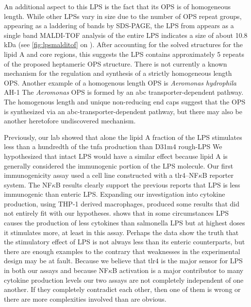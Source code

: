 An additional aspect to this \ac{LPS} is the fact that its \ac{OPS} is of homogeneous length. While
other \ac{LPS}s vary in size due to the number of \ac{OPS} repeat groups, appearing as a laddering
of bands by \ac{SDS-PAGE}, the \ac{LPS} from \caulobacter appears as a single
band \ac{MALDI-TOF} analysis of the entire \ac{LPS} indicates a size of
about 10.8 kDa (see \cref{fig:lpsmalditof} on ).  After accounting for the
solved structures for the lipid A and core regions, this suggests the \ac{LPS} contains
approximately 5 repeats of the proposed heptameric \ac{OPS} structure.  There is not currently a
known mechanism for the regulation and synthesis of a strictly homogeneous
length \ac{OPS}. Another example of a homogenous length \ac{OPS} is
\textit{Aeromonas hydrophila} AH-1 The
\textit{Aeromonas} \ac{OPS} is formed by an \ac{abc} transporter-dependent
pathway. The homogenous length and unique non-reducing end caps suggest that
the \caulobacter \ac{OPS} is synthesized via an \ac{abc}-transporter-dependent
pathway, but there may also be another heretofore undiscovered mechanism. 


Previously, our lab showed that alone the \caulobacter{} lipid A fraction of the \ac{LPS} stimulates less
than a hundredth of the \ac{tnfa} production than \ecoli{} D31m4
rough-\ac{LPS} We hypothesized that intact
\caulobacter{} \ac{LPS} would have a similar effect because lipid A is generally
considered the immunogenic portion of the \ac{LPS} molecule. Our  first
immunogenicity assay used a cell line constructed with a \ac{tlr4}--NF$\kappa$B
reporter system. The NF$\kappa$B results clearly support the previous reports
that \caulobacter{} \ac{LPS} is less immunogenic than enteric \ac{LPS}.
Expanding our investigation into cytokine production, using THP-1 derived
macrophages, produced some results that  did not entirely fit with our hypotheses.
 shows that in some  circumstances \caulobacter{}
\ac{LPS} causes the production of less cytokines than \ac{salmonella} \ac{LPS}
but at highest doses it stimulates more, at least in this assay. Perhaps
the data show the truth that the stimulatory effect of \caulobacter{} \ac{LPS}
is not always less than its enteric counterparts, but there are enough examples
to the contrary that weaknesses in the experimental design may be at fault.
Because we believe that \ac{tlr4} is the major sensor for \ac{LPS} in both our assays
and because NF$\kappa$B activation is a major contributor to many cytokine
production levels our two assays are not completely independent of one another. If they completely contradict each other, then one of them is wrong or there are more complexities involved than are obvious. 


